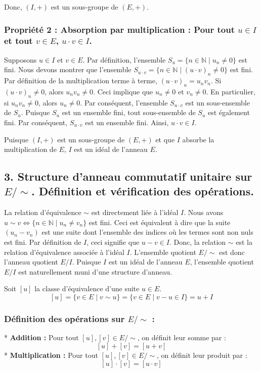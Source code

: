 \documentclass{report}
\begin{document}
Donc, $(I, +)$ est un sous-groupe de $(E, +)$.

\subsubsection*{Propriété 2 : Absorption par multiplication : Pour tout $u \in I$ et tout $v \in E$, $u \cdot v \in I$.}
Supposons $u \in I$ et $v \in E$.
Par définition, l'ensemble $S_u = \{ n \in \mathbb{N} \mid u_n \neq 0 \}$ est fini.
Nous devons montrer que l'ensemble $S_{u \cdot v} = \{ n \in \mathbb{N} \mid (u \cdot v)_n \neq 0 \}$ est fini.
Par définition de la multiplication terme à terme, $(u \cdot v)_n = u_n v_n$.
Si $(u \cdot v)_n \neq 0$, alors $u_n v_n \neq 0$.
Ceci implique que $u_n \neq 0$ et $v_n \neq 0$.
En particulier, si $u_n v_n \neq 0$, alors $u_n \neq 0$.
Par conséquent, l'ensemble $S_{u \cdot v}$ est un sous-ensemble de $S_u$.
Puisque $S_u$ est un ensemble fini, tout sous-ensemble de $S_u$ est également fini.
Par conséquent, $S_{u \cdot v}$ est un ensemble fini.
Ainsi, $u \cdot v \in I$.

Puisque $(I, +)$ est un sous-groupe de $(E, +)$ et que $I$ absorbe la multiplication de $E$, $I$ est un idéal de l'anneau $E$.

\subsection*{3. Structure d'anneau commutatif unitaire sur $E/\sim$. Définition et vérification des opérations.}

La relation d'équivalence $\sim$ est directement liée à l'idéal $I$.
Nous avons $u \sim v \iff \{ n \in \mathbb{N} \mid u_n \neq v_n \}$ est fini.
Ceci est équivalent à dire que la suite $(u_n - v_n)$ est une suite dont l'ensemble des indices où les termes sont non nuls est fini.
Par définition de $I$, ceci signifie que $u-v \in I$.
Donc, la relation $\sim$ est la relation d'équivalence associée à l'idéal $I$.
L'ensemble quotient $E/\sim$ est donc l'anneau quotient $E/I$.
Puisque $I$ est un idéal de l'anneau $E$, l'ensemble quotient $E/I$ est naturellement muni d'une structure d'anneau.

Soit $[u]$ la classe d'équivalence d'une suite $u \in E$.
$$ [u] = \{ v \in E \mid v \sim u \} = \{ v \in E \mid v-u \in I \} = u+I $$

\subsubsection*{Définition des opérations sur $E/\sim$ :}
*   \textbf{Addition :} Pour tout $[u], [v] \in E/\sim$, on définit leur somme par :
    $$ [u] + [v] = [u+v] $$
*   \textbf{Multiplication :} Pour tout $[u], [v] \in E/\sim$, on définit leur produit par :
    $$ [u] \cdot [v] = [u \cdot v] $$
\end{document}
